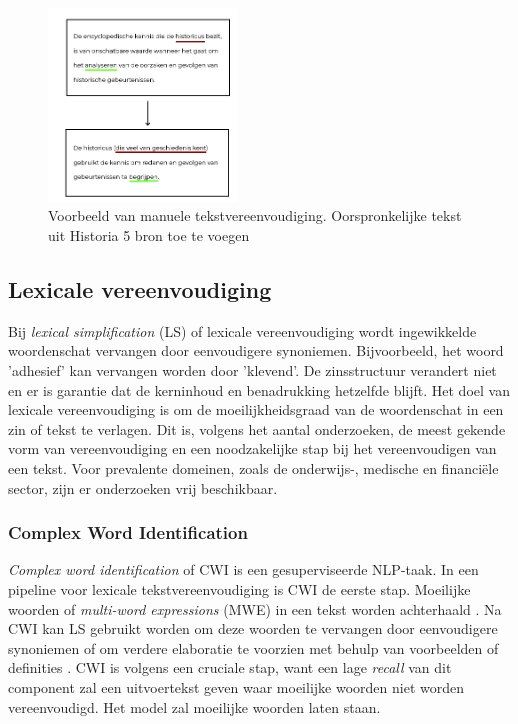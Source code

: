 \begin{figure}[H]
	\begin{center}
			\includegraphics[width=5cm]{img/voorbeeld-manuele-vereenvoudiging.png}
	\end{center}
	\caption{Voorbeeld van manuele tekstvereenvoudiging. Oorspronkelijke tekst uit Historia 5 bron toe te voegen}
\end{figure}

\subsection{Lexicale vereenvoudiging}

Bij \textit{lexical simplification} (LS) of lexicale vereenvoudiging wordt ingewikkelde woordenschat vervangen door eenvoudigere synoniemen. Bijvoorbeeld, het woord 'adhesief' kan vervangen worden door 'klevend'. De zinsstructuur verandert niet en er is garantie dat de kerninhoud en benadrukking hetzelfde blijft. Het doel van lexicale vereenvoudiging is om de moeilijkheidsgraad van de woordenschat in een zin of tekst te verlagen. Dit is, volgens het aantal onderzoeken, de meest gekende vorm van vereenvoudiging en een noodzakelijke stap bij het vereenvoudigen van een tekst. Voor prevalente domeinen, zoals de onderwijs-, medische en financiële sector, zijn er onderzoeken vrij beschikbaar. 


\subsubsection{Complex Word Identification}

\textit{Complex word identification} of CWI is een gesuperviseerde NLP-taak. In een pipeline voor lexicale tekstvereenvoudiging is CWI de eerste stap. Moeilijke woorden of \textit{multi-word expressions} (MWE) in een tekst worden achterhaald  \autocite{Shardlow2013, Gooding2019}. Na CWI kan LS gebruikt worden om deze woorden te vervangen door eenvoudigere synoniemen of om verdere elaboratie te voorzien met behulp van voorbeelden of definities \autocite{Zeng2005, Kandula2010}. CWI is volgens \textcite{Shardlow2013} een cruciale stap, want een lage \textit{recall} van dit component zal een uitvoertekst geven waar moeilijke woorden niet worden vereenvoudigd. Het model zal moeilijke woorden laten staan.

